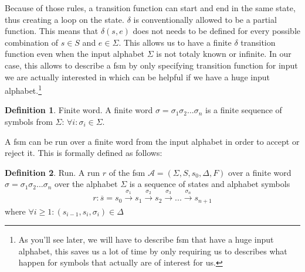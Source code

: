 \documentclass[12pt]{article}
\theoremstyle{definition}
\newtheorem{definition}{Definition}[section]
\theoremstyle{definition}
\theoremstyle{remark}
\newcommand{\A}{\mathcal{A}}
\begin{document}
Because of those rules, a transition function can start and end in the same state, thus creating a loop on the state. $\delta$ is conventionally allowed to be a partial function. This means that $\delta(s, e)$ does not needs to be defined for every possible combination of $s \in S$ and $e \in \Sigma$. This allows us to have a finite $\delta$ transition function even when the input alphabet $\Sigma$ is not totaly known or infinite. In our case, this allows to describe a \gls{fsm} by only specifying transition function for input we are actually interested in which can be helpful if we have a huge input alphabet.\footnote{As you'll see later, we will have to describe \gls{fsm} that have a huge input alphabet, this saves us a lot of time by only requiring us to describes what happen for symbols that actually are of interest for us.}


\theoremstyle{definition}
\begin{definition}{Finite word.} A finite word $\sigma = \sigma_1 \sigma_2 ... \sigma_n$ is a finite sequence of symbols from $\Sigma$: $\forall i: \sigma_i \in \Sigma$.
\end{definition}


A \gls{fsm} can be run over a finite word from the input alphabet in order to accept or reject it. This is formally defined as follows:

\theoremstyle{definition}
\begin{definition}{Run.} A run $r$ of the \gls{fsm} $\A = (\Sigma, S, s_{0}, \Delta, F)$ over a finite word $\sigma = \sigma_1 \sigma_2 ... \sigma_n$ over the alphabet $\Sigma$ is a sequence of states and alphabet symbols
$$r: \overline{s} = s_0 \xrightarrow[]{\sigma_1} s_1 \xrightarrow[]{\sigma_2} s_2 \xrightarrow[]{\sigma_3} ... \xrightarrow[]{\sigma_n} s_{n+1}$$ where $\forall i \ge 1: (s_{i-1}, s_i, \sigma_i) \in \Delta$
\end{definition}
\end{document}

